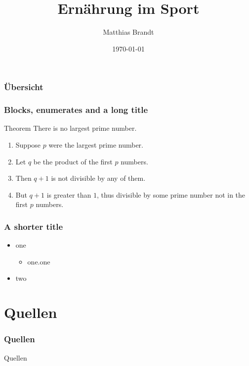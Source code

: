 \documentclass[ngerman, aspectratio=169]{beamer}
\title{Ernährung im Sport}
\date{\today}
\author[M. Brandt]{Matthias Brandt}
\institute{Deutscher\par Frisbeesport-Verband e.V.}
\begin{document}
\begin{frame}
  \titlepage
\end{frame}

\begin{frame}
  \frametitle{Übersicht}
  \tableofcontents
\end{frame}

\begin{frame} 
  \frametitle{Blocks, enumerates and a long title} 
  \begin{block}{\centering Theorem}
    There is no largest prime number.
  \end{block} 

  \begin{enumerate} 
  \item<1-| alert@1> Suppose $p$ were the largest prime number. 
  \item<2-> Let $q$ be the product of the first $p$ numbers. 
  \item<3-> Then $q+1$ is not divisible by any of them. 
  \item<4-> But $q + 1$ is greater than $1$, thus divisible by some prime
    number not in the first $p$ numbers.
  \end{enumerate}
\end{frame}

\begin{frame}
  \frametitle{A shorter title}
  \begin{itemize}
  \item one
    \begin{itemize}
    \item one.one
    \end{itemize}
  \item two
  \end{itemize}
\end{frame}

\section{Quellen}
\begin{frame}
  \frametitle{Quellen}
  Quellen
\end{frame}
\end{document}
